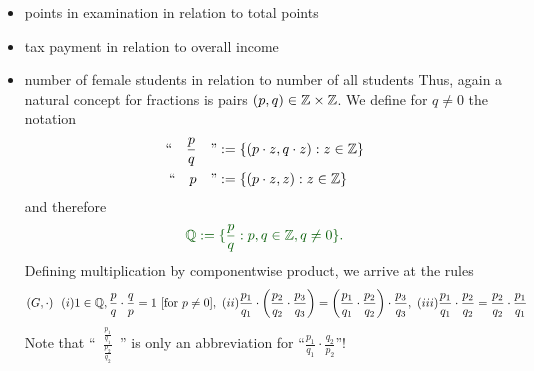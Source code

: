 {\begin{itemize}
	\begin{defi}[group]
		\[
		(G,+)~~~ (i)~0\in\Z,~~ z+(-z)=0,~~ (ii)~z_1+(z_2+z_3)=(z_1+z_2)+z_3,~~ (iii)~z_1+z_2=z_2+z_1
		\]
		$\rightarrow$ Note that ``$z_1-z_2$'' is only an abbreviation for ``$z_1+(-z_2)$''!
	\end{defi}

	{\color{satzrot} $\Z$ equipped with + is a group }
	
	

	In real life, fractions exist again in relations:
	\ite
	\item points in examination in relation to total points\\[-0.8cm]
	\item tax payment in relation to overall income\\[-0.8cm]
	\item number of female students in relation to number of all students
	\eti
	Thus, again a natural concept for fractions is pairs $(p,q)\in{\mathbb{Z}}\times{\mathbb{Z}}$. We define for $q\neq 0$ the notation
	\vspace{-0.5cm}\color{defgruen}
	\begin{align*}
	\text{``}\quad \frac{p}{q}\quad \text{''} &:= \{(p\cdot z,q\cdot z): z\in{\mathbb{Z}}\}\\
	\text{``}\quad p \quad \text{''} &:= \{(p\cdot z,z): z\in{\mathbb{Z}}\}
	\end{align*}
	\color{black}
	and therefore $$\color{defgruen} \Q:=\{\frac{p}{q}: p,q\in\Z, q\neq 0\}.$$
	Defining multiplication by componentwise product, we arrive at the rules
	{\color{satzrot}
		\[ (G,\cdot) ~~(i)
		1\in{\mathbb{Q}}, \frac{p}{q}\cdot\frac{q}{p} =1\text{ [for $p\neq0$]}, 
		~(ii)\frac{p_1}{q_1}\cdot \left(\frac{p_2}{q_2}\cdot\frac{p_3}{q_3}\right)=\left(\frac{p_1}{q_1}\cdot \frac{p_2}{q_2}\right)\cdot\frac{p_3}{q_3},
		~(iii) \frac{p_1}{q_1}\cdot \frac{p_2}{q_2}=\frac{p_2}{q_2}\cdot \frac{p_1}{q_1}
		\]
		Note that ``\ $\frac{\frac{p_1}{q_1}}{\frac{p_2}{q_2}}$\ '' is only an abbreviation for ``$\frac{p_1}{q_1}\cdot \frac{q_2}{p_2}$''!}
	

\end{itemize}}
